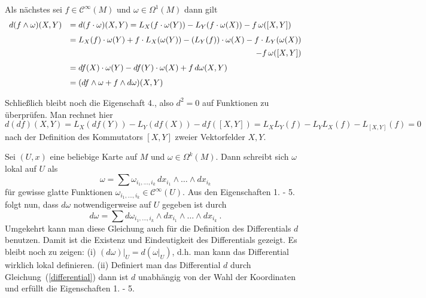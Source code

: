 \documentclass[12pt,a4paper]{article}
\begin{document}
Als n\"achstes sei $f\in \mathcal C^\infty(M)$ und $\omega \in \Omega^1(M)$ dann gilt
$$
\begin{array}{rl}
d(f \wedge \omega)(X,Y) & = d(f\cdot \omega)(X,Y)
=
L_X(f\cdot \omega(Y) ) - L_Y(f\cdot \omega(X)) -f \, \omega([X,Y])\\[1.5ex]
& =
L_X(f)\cdot \omega(Y) + f\cdot L_X(\omega(Y)) - (L_Y(f))\cdot \omega(X) -
f\cdot L_Y(\omega(X)) \\[1ex]
& \hfill -f \, \omega([X,Y])\\[1.5ex]
& =
df(X) \cdot \omega(Y) - df(Y) \cdot \omega(X) + f\,d\omega(X,Y)\\[1.5ex]
& =
(df \wedge \omega  + f \wedge d\omega)(X,Y)
\end{array}
$$

\medskip

Schlie\ss lich bleibt noch die Eigenschaft 4., also $d^2=0$ auf Funktionen
zu \"uberpr\"ufen. Man rechnet hier
$$
d(df)(X,Y) = L_X(df(Y)) - L_Y(df(X)) - df ([X,Y])
=
L_X L_Y(f) - L_Y L_X(f) - L_{[X,Y]}(f) = 0
$$
nach der Definition des Kommutators $[X,Y]$ zweier Vektorfelder $X,Y$.

\medskip

Sei $(U,x)$ eine beliebige Karte auf $M$ und $\omega \in \Omega^k(M)$. Dann schreibt sich
$\omega$ lokal auf $U$ als
$$
\omega =    \sum \omega_{i_1,\ldots, i_k} \, dx_{i_1} \wedge \ldots \wedge dx_{i_k}
$$
f\"ur gewisse glatte Funktionen $\omega_{i_1,\ldots, i_k}\in \mathcal C^\infty(U)$.
Aus den Eigenschaften 1. - 5. folgt nun, dass $d\omega$ notwendigerweise auf $U$ gegeben ist
durch
\begin{equation}\label{differential}
d\omega = \sum  d\omega_{i_1,\ldots, i_k} \wedge dx_{i_1} \wedge \ldots \wedge dx_{i_k} \ .
\end{equation}
Umgekehrt kann man diese Gleichung auch f\"ur die Definition des Differentials $d$ benutzen.
Damit ist die Existenz und Eindeutigkeit des Differentials gezeigt. Es bleibt noch zu zeigen:
(i) $\left.(d\omega)\right|_U= d(\left. \omega\right|_U)$, d.h. man kann das Differential
wirklich lokal definieren. (ii) Definiert man das Differential $d$ durch Gleichung~(\ref{differential})
dann ist $d$ unabh\"angig von der Wahl der Koordinaten und erf\"ullt die Eigenschaften 1. - 5.

\medskip
\end{document}
